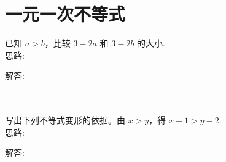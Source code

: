 \section{一元一次不等式}

\item {
    已知 $a > b$，比较 $3-2a$ 和 $3-2b$ 的大小.
    \ifshowSolution
        \fangsong{}
        \\
        思路:

        解答: 
    \else
        \\ \\ \\
    \fi
}

\item {
    写出下列不等式变形的依据。由 $x > y$，得 $x-1 > y-2$.
    \ifshowSolution
        \fangsong{}
        \\
        思路:

        解答: 
    \else
        \\ \\ \\
    \fi
}